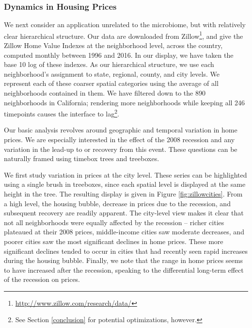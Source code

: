 \documentclass[12pt]{article}
\begin{document}
\subsubsection*{Dynamics in Housing Prices}\label{zillow-study}

We next consider an application unrelated to the microbiome, but with
relatively clear hierarchical structure. Our data are downloaded from
Zillow\footnote{\url{http://www.zillow.com/research/data/}}, and give
the Zillow Home Value Indexes at the neighborhood level, across the
country, computed monthly between 1996 and 2016. In our display, we have
taken the base 10 log of these indexes. As our hierarchical structure,
we use each neighborhood's assignment to state, regional, county, and
city levels. We represent each of these coarser spatial categories using
the average of all neighborhoods contained in them. We have filtered
down to the 890 neighborhoods in California; rendering more
neighborhoods while keeping all 246 timepoints causes the interface to
lag\footnote{See Section \ref{conclusion} for potential optimizations,
  however.}.

Our basic analysis revolves around geographic and temporal variation in
home prices. We are especially interested in the effect of the 2008
recession and any variation in the lead-up to or recovery from this
event. These questions can be naturally framed using timebox trees and
treeboxes.

We first study variation in prices at the city level. These series can
be highlighted using a single brush in treeboxes, since each spatial
level is displayed at the same height in the tree. The resulting display
is given in Figure \ref{fig:zillowcities}. From a high level, the
housing bubble, decrease in prices due to the recession, and subsequent
recovery are readily apparent. The city-level view makes it clear that
not all neighborhoods were equally affected by the recession -- richer
cities plateaued at their 2008 prices, middle-income cities saw moderate
decreases, and poorer cities saw the most significant declines in home
prices. These more significant declines tended to occur in cities that
had recently seen rapid increases during the housing bubble. Finally, we
note that the range in home prices seems to have increased after the
recession, speaking to the differential long-term effect of the
recession on prices.
\end{document}
